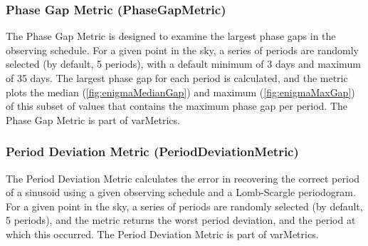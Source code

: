 \subsubsection{Phase Gap Metric (PhaseGapMetric)}

The Phase Gap Metric is designed to examine the largest phase gaps in
the observing schedule. For a given point in the sky, a series of
periods are randomly selected (by default, 5 periods), with a default
minimum of 3 days and maximum of 35 days. The largest phase gap for each
period is calculated, and the metric plots the median
(\autoref{fig:enigmaMedianGap}) and maximum (\autoref{fig:enigmaMaxGap})
of this subset of values that contains the maximum phase gap per period.
The Phase Gap Metric is part of varMetrics.

\subsubsection{Period Deviation Metric (PeriodDeviationMetric)}

The Period Deviation Metric calculates the error in recovering the
correct period of a sinusoid using a given observing schedule and a
Lomb-Scargle periodogram. For a given point in the sky, a series of
periods are randomly selected (by default, 5 periods), and the metric
returns the worst period deviation, and the period at which this
occurred. The Period Deviation Metric is part of varMetrics.








%
%
%
